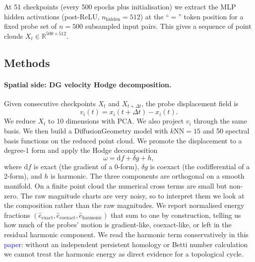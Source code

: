 \documentclass[11pt]{article}
\newcommand{\R}{\mathbb{R}}
\newcommand{\addedtext}[1]{\textcolor{blue}{#1}}
\theoremstyle{remark}
\begin{document}
At 51 checkpoints (every 500 epochs plus initialisation) we extract the MLP hidden activations (post-ReLU, $n_{\mathrm{hidden}} = 512$) at the ``$=$'' token position for a fixed probe set of $n = 500$ subsampled input pairs. This gives a sequence of point clouds $X_t \in \R^{500 \times 512}$.

\subsection{Methods}

\paragraph{Spatial side: DG velocity Hodge decomposition.} Given consecutive checkpoints $X_t$ and $X_{t+\Delta t}$, the probe displacement field is
\[
v_i(t) = x_i(t+\Delta t) - x_i(t).
\]
We reduce $X_t$ to 10 dimensions with PCA. We also project $v_i$ through the same basis. We then build a DiffusionGeometry model \citep{jones2025diffusion,jones2026computing} with $k$NN${}=15$ and 50 spectral basis functions on the reduced point cloud. We promote the displacement to a degree-1 form and apply the Hodge decomposition
\[
\omega = \mathrm{d} f + \delta g + h,
\]
where $\mathrm{d} f$ is exact (the gradient of a 0-form), $\delta g$ is coexact (the codifferential of a 2-form), and $h$ is harmonic. The three components are orthogonal on a smooth manifold. On a finite point cloud the numerical cross terms are small but non-zero. The raw magnitude charts are very noisy, so to interpret them we look at the composition rather than the raw magnitudes. We report normalised energy fractions $(\hat{e}_{\mathrm{exact}}, \hat{e}_{\mathrm{coexact}}, \hat{e}_{\mathrm{harmonic}})$ that sum to one by construction, telling us how much of the probes' motion is gradient-like, coexact-like, or left in the residual harmonic component. We read the harmonic term conservatively in this \addedtext{paper}: without an independent persistent homology or Betti number calculation we cannot treat the harmonic energy as direct evidence for a topological cycle.
\end{document}
